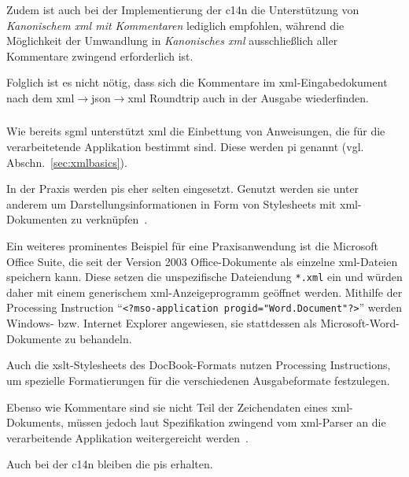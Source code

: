 Zudem ist auch bei der Implementierung der \acrlong{c14n} die Unterstützung von \emph{Kanonischem \acrshort{xml} mit Kommentaren} lediglich empfohlen, während die Möglichkeit der Umwandlung in \emph{Kanonisches \acrshort{xml}} ausschließlich aller Kommentare zwingend erforderlich ist.~\cite[Abschn.~2.1]{c14n}

Folglich ist es nicht nötig, dass sich die Kommentare im \acrshort{xml}-Eingabedokument nach dem \acrshort{xml}$\rightarrow$\acrshort{json}$\rightarrow$\acrshort{xml} Roundtrip auch in der Ausgabe wiederfinden.

\subsubsection{}

Wie bereits \acrshort{sgml} unterstützt \acrshort{xml} die Einbettung von Anweisungen, die für die verarbeitetende Applikation bestimmt sind. Diese werden \acrfull{pi} genannt (vgl. Abschn.~\ref{sec:xmlbasics}).

In der Praxis werden \glspl{pi} eher selten eingesetzt. Genutzt werden sie unter anderem um Darstellungsinformationen in Form von Stylesheets mit \acrshort{xml}-Dokumenten zu verknüpfen~\cite[Abschn.~4]{xmlstylesheet}.

Ein weiteres prominentes Beispiel für eine Praxisanwendung ist die Microsoft Office Suite, die seit der Version 2003 Office-Dokumente als einzelne \acrshort{xml}-Dateien speichern kann. Diese setzen die unspezifische Dateiendung \texttt{*.xml} ein und würden daher mit einem generischem \acrshort{xml}-Anzeigeprogramm geöffnet werden. Mithilfe der Processing Instruction \enquote{\texttt{<?mso-application progid="Word.Document"?>}} werden Windows- bzw. Internet Explorer angewiesen, sie stattdessen als Microsoft-Word-Dokumente zu behandeln.~\cite[Abschn.~3.2]{tverskov2008understandingpi}

Auch die \acrshort{xslt}-Stylesheets des DocBook-Formats nutzen Processing Instructions, um spezielle Formatierungen für die verschiedenen Ausgabeformate festzulegen.~\cite[{Kapitel \enquote{User Reference: PIs}}]{docbookxsl}

Ebenso wie Kommentare sind sie nicht Teil der Zeichendaten eines \acrshort{xml}-Dokuments, müssen jedoch laut Spezifikation zwingend vom \acrshort{xml}-Parser an die verarbeitende Applikation weitergereicht werden~\cite[Abschn.~2.6]{xml}.

Auch bei der \acrlong{c14n} bleiben die \glspl{pi} erhalten.~\cite[Abschn.~2.3]{c14n}


